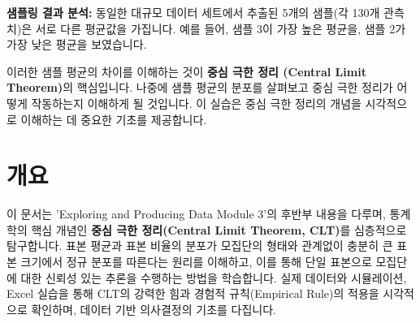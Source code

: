 \documentclass[11pt,a4paper]{book}
\newcommand{\concept}[1]{\textbf{#1}}
\theoremstyle{definition}
\begin{document}
\begin{tcolorbox}[summarybox]
\textbf{샘플링 결과 분석:}
동일한 대규모 데이터 세트에서 추출된 5개의 샘플(각 130개 관측치)은 서로 다른 평균값을 가집니다. 예를 들어, 샘플 3이 가장 높은 평균을, 샘플 2가 가장 낮은 평균을 보였습니다.

이러한 샘플 평균의 차이를 이해하는 것이 \concept{중심 극한 정리 (Central Limit Theorem)}의 핵심입니다. 나중에 샘플 평균의 분포를 살펴보고 중심 극한 정리가 어떻게 작동하는지 이해하게 될 것입니다. 이 실습은 중심 극한 정리의 개념을 시각적으로 이해하는 데 중요한 기초를 제공합니다.
\end{tcolorbox}


\section{개요}
\begin{summarybox}[title={문서 핵심 요약}]
이 문서는 'Exploring and Producing Data Module 3'의 후반부 내용을 다루며,
통계학의 핵심 개념인 \textbf{중심 극한 정리(Central Limit Theorem, CLT)}를 심층적으로 탐구합니다.
표본 평균과 표본 비율의 분포가 모집단의 형태와 관계없이 충분히 큰 표본 크기에서 정규 분포를 따른다는 원리를 이해하고,
이를 통해 단일 표본으로 모집단에 대한 신뢰성 있는 추론을 수행하는 방법을 학습합니다.
실제 데이터와 시뮬레이션, Excel 실습을 통해 CLT의 강력한 힘과 경험적 규칙(Empirical Rule)의 적용을 시각적으로 확인하며,
데이터 기반 의사결정의 기초를 다집니다.
\end{summarybox}
\end{document}
